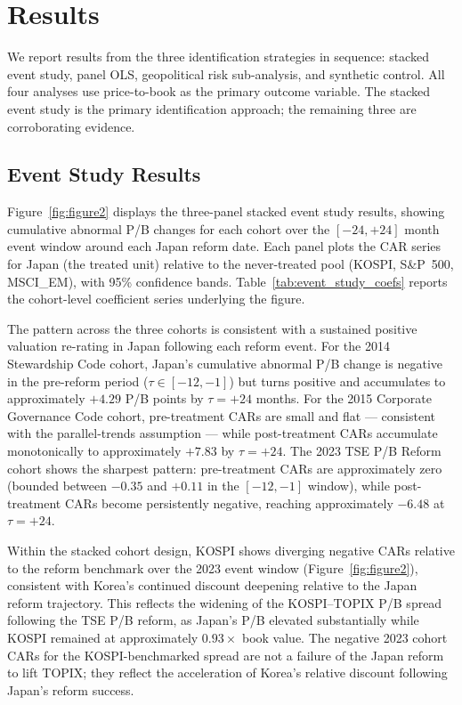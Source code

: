 \documentclass[12pt]{article}
\begin{document}
\section{Results}
\label{sec:results}

We report results from the three identification strategies in sequence: stacked event study,
panel OLS, geopolitical risk sub-analysis, and synthetic control. All four analyses use
price-to-book as the primary outcome variable. The stacked event study is the primary
identification approach; the remaining three are corroborating evidence.

\subsection{Event Study Results}

Figure~\ref{fig:figure2} displays the three-panel stacked event study results, showing
cumulative abnormal P/B changes for each cohort over the $[-24, +24]$ month event window
around each Japan reform date. Each panel plots the CAR series for Japan (the treated unit)
relative to the never-treated pool (KOSPI, S\&P~500, MSCI\_EM), with 95\% confidence bands.
Table~\ref{tab:event_study_coefs} reports the cohort-level coefficient series underlying
the figure.

The pattern across the three cohorts is consistent with a sustained positive valuation
re-rating in Japan following each reform event. For the 2014 Stewardship Code cohort,
Japan's cumulative abnormal P/B change is negative in the pre-reform period ($\tau \in [-12, -1]$)
but turns positive and accumulates to approximately $+4.29$ P/B points by $\tau = +24$ months.
For the 2015 Corporate Governance Code cohort, pre-treatment CARs are small and flat ---
consistent with the parallel-trends assumption --- while post-treatment CARs accumulate
monotonically to approximately $+7.83$ by $\tau = +24$. The 2023 TSE P/B Reform cohort
shows the sharpest pattern: pre-treatment CARs are approximately zero (bounded between
$-0.35$ and $+0.11$ in the $[-12, -1]$ window), while post-treatment CARs become persistently
negative, reaching approximately $-6.48$ at $\tau = +24$.

Within the stacked cohort design, KOSPI shows diverging negative CARs relative to the
reform benchmark over the 2023 event window (Figure~\ref{fig:figure2}), consistent with
Korea's continued discount deepening relative to the Japan reform trajectory. This reflects
the widening of the KOSPI--TOPIX P/B spread following the TSE P/B reform, as Japan's
P/B elevated substantially while KOSPI remained at approximately $0.93\times$ book value.
The negative 2023 cohort CARs for the KOSPI-benchmarked spread are not a failure of the
Japan reform to lift TOPIX; they reflect the acceleration of Korea's relative discount
following Japan's reform success.
\end{document}

